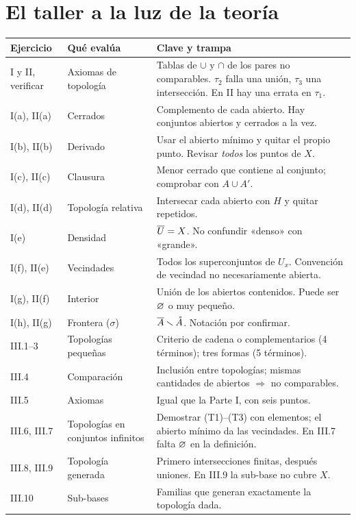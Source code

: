 \section{El taller a la luz de la teoría}
\begin{center}\small\renewcommand{\arraystretch}{1.3}
\begin{longtable}{@{}p{2.3cm}p{4.3cm}p{8.8cm}@{}}\toprule
\textbf{Ejercicio} & \textbf{Qué evalúa} & \textbf{Clave y trampa}\\ \midrule\endhead
I y II, verificar & Axiomas de topología & Tablas de $\cup$ y $\cap$ de los pares no comparables. $\tau_2$ falla una
unión, $\tau_3$ una intersección. En II hay una errata en $\tau_1$.\\
I(a), II(a) & Cerrados & Complemento de cada abierto. Hay conjuntos abiertos y cerrados a la vez.\\
I(b), II(b) & Derivado & Usar el abierto mínimo y quitar el propio punto. Revisar \emph{todos} los puntos de $X$.\\
I(c), II(c) & Clausura & Menor cerrado que contiene al conjunto; comprobar con $A\cup A'$.\\
I(d), II(d) & Topología relativa & Intersecar cada abierto con $H$ y quitar repetidos.\\
I(e) & Densidad & $\overline{U}=X$. No confundir «denso» con «grande».\\
I(f), II(e) & Vecindades & Todos los superconjuntos de $U_x$. Convención de vecindad no necesariamente abierta.\\
I(g), II(f) & Interior & Unión de los abiertos contenidos. Puede ser $\varnothing$ o muy pequeño.\\
I(h), II(g) & Frontera ($\sigma$) & $\overline{A}\smallsetminus\mathring{A}$. Notación por confirmar.\\
III.1--3 & Topologías pequeñas & Criterio de cadena o complementarios (4 términos); tres formas (5 términos).\\
III.4 & Comparación & Inclusión entre topologías; mismas cantidades de abiertos $\Rightarrow$ no comparables.\\
III.5 & Axiomas & Igual que la Parte I, con seis puntos.\\
III.6, III.7 & Topologías en conjuntos infinitos & Demostrar (T1)--(T3) con elementos; el abierto mínimo da las
vecindades. En III.7 falta $\varnothing$ en la definición.\\
III.8, III.9 & Topología generada & Primero intersecciones finitas, después uniones. En III.9 la sub-base no cubre $X$.\\
III.10 & Sub-bases & Familias que generan exactamente la topología dada.\\

\end{longtable}
\end{center}
